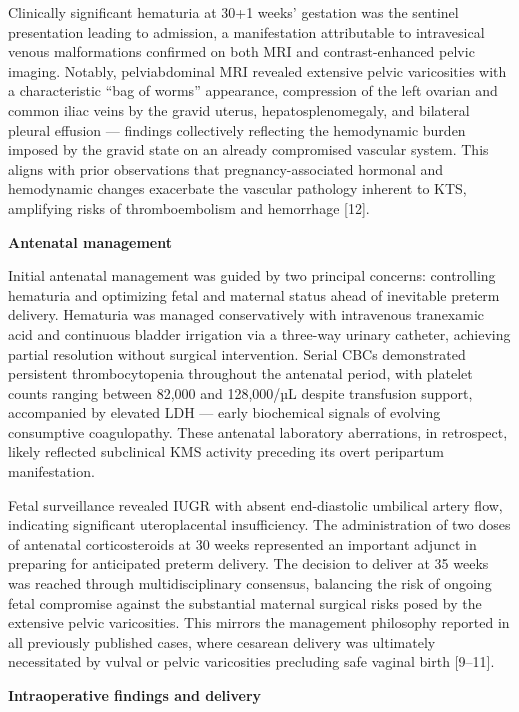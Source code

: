 \documentclass[
  letterpaper,
  DIV=11,
  numbers=noendperiod]{scrartcl}
\begin{document}
Clinically significant hematuria at 30+1 weeks' gestation was the
sentinel presentation leading to admission, a manifestation attributable
to intravesical venous malformations confirmed on both MRI and
contrast-enhanced pelvic imaging. Notably, pelviabdominal MRI revealed
extensive pelvic varicosities with a characteristic ``bag of worms''
appearance, compression of the left ovarian and common iliac veins by
the gravid uterus, hepatosplenomegaly, and bilateral pleural effusion
--- findings collectively reflecting the hemodynamic burden imposed by
the gravid state on an already compromised vascular system. This aligns
with prior observations that pregnancy-associated hormonal and
hemodynamic changes exacerbate the vascular pathology inherent to KTS,
amplifying risks of thromboembolism and hemorrhage {[}12{]}.

\textbf{Antenatal management}

Initial antenatal management was guided by two principal concerns:
controlling hematuria and optimizing fetal and maternal status ahead of
inevitable preterm delivery. Hematuria was managed conservatively with
intravenous tranexamic acid and continuous bladder irrigation via a
three-way urinary catheter, achieving partial resolution without
surgical intervention. Serial CBCs demonstrated persistent
thrombocytopenia throughout the antenatal period, with platelet counts
ranging between 82,000 and 128,000/µL despite transfusion support,
accompanied by elevated LDH --- early biochemical signals of evolving
consumptive coagulopathy. These antenatal laboratory aberrations, in
retrospect, likely reflected subclinical KMS activity preceding its
overt peripartum manifestation.

Fetal surveillance revealed IUGR with absent end-diastolic umbilical
artery flow, indicating significant uteroplacental insufficiency. The
administration of two doses of antenatal corticosteroids at 30 weeks
represented an important adjunct in preparing for anticipated preterm
delivery. The decision to deliver at 35 weeks was reached through
multidisciplinary consensus, balancing the risk of ongoing fetal
compromise against the substantial maternal surgical risks posed by the
extensive pelvic varicosities. This mirrors the management philosophy
reported in all previously published cases, where cesarean delivery was
ultimately necessitated by vulval or pelvic varicosities precluding safe
vaginal birth {[}9--11{]}.

\textbf{Intraoperative findings and delivery}
\end{document}
